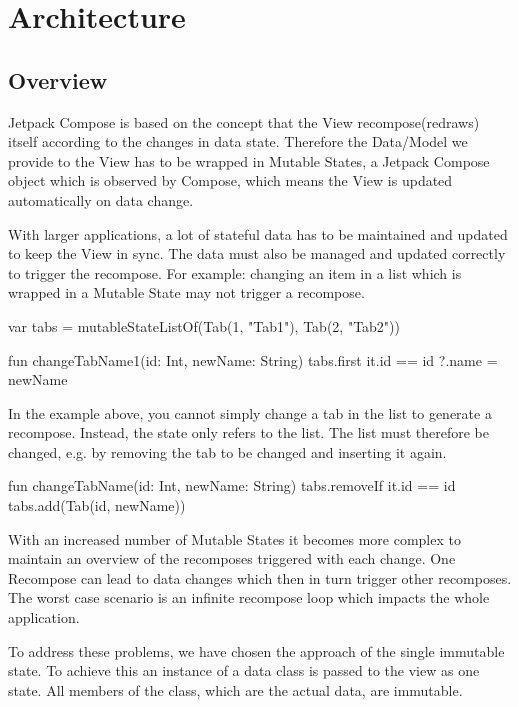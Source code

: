 \section{Architecture}
\subsection{Overview}
Jetpack Compose is based on the concept that the View recompose(redraws) itself according to the changes in data state. Therefore the Data/Model we provide to the View has to be wrapped in Mutable States, a Jetpack Compose object which is observed by Compose, which means the View is updated automatically on data change.

With larger applications, a lot of stateful data has to be maintained and updated to keep the View in sync. The data must also be managed and updated correctly to trigger the recompose. For example: changing an item in a list which is wrapped in a Mutable State may not trigger a recompose.

\begin{kotlincode}
var tabs = mutableStateListOf(Tab(1, "Tab1"), Tab(2, "Tab2"))

fun changeTabName1(id: Int, newName: String) {
    tabs.first { it.id == id }?.name = newName
}
\end{kotlincode}

In the example above, you cannot simply change a tab in the list to generate a recompose. Instead, the state only refers to the list. The list must therefore be changed, e.g. by removing the tab to be changed and inserting it again.

\begin{kotlincode}
fun changeTabName(id: Int, newName: String) {
    tabs.removeIf { it.id == id }
    tabs.add(Tab(id, newName))
}
\end{kotlincode}

With an increased number of Mutable States it becomes more complex to maintain an overview of the recomposes triggered with each change. One Recompose can lead to data changes which then in turn trigger other recomposes. The worst case scenario is an infinite recompose loop which impacts the whole application.

To address these problems, we have chosen the approach of the single immutable state. To achieve this an instance of a data class is passed to the view as one state. All members of the class, which are the actual data, are immutable.

